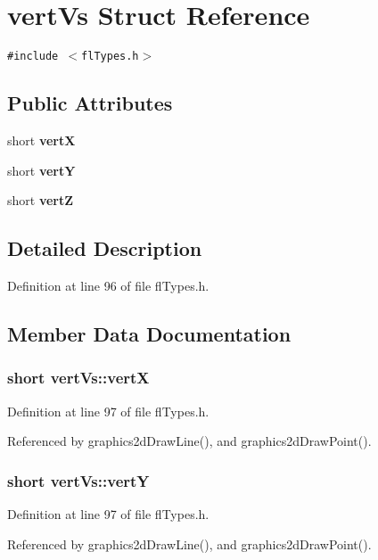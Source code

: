 \section{vert\-Vs Struct Reference}
\label{structvertVs}
{\tt \#include $<$fl\-Types.h$>$}

\subsection*{Public Attributes}
\begin{CompactItemize}
\item 
short {\bf vert\-X}
\item 
short {\bf vert\-Y}
\item 
short {\bf vert\-Z}
\end{CompactItemize}


\subsection{Detailed Description}




Definition at line 96 of file fl\-Types.h.

\subsection{Member Data Documentation}
\subsubsection{\setlength{\rightskip}{0pt plus 5cm}short {\bf vert\-Vs::vert\-X}}\label{structvertVs_233d56c7a3c1d005430ab480ad9eea57}




Definition at line 97 of file fl\-Types.h.

Referenced by graphics2d\-Draw\-Line(), and graphics2d\-Draw\-Point().
\subsubsection{\setlength{\rightskip}{0pt plus 5cm}short {\bf vert\-Vs::vert\-Y}}\label{structvertVs_40238cd4321d7c26a1f492c70e6069bf}




Definition at line 97 of file fl\-Types.h.

Referenced by graphics2d\-Draw\-Line(), and graphics2d\-Draw\-Point().

